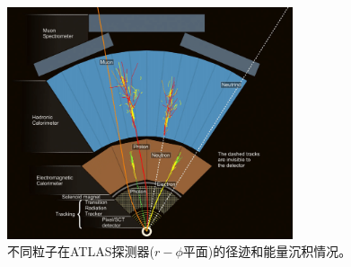 \begin{figure}
\centering
\includegraphics[width=0.75\textwidth]{fig/particle_ID_patterns.png}
\caption{不同粒子在ATLAS探测器($r-\phi$平面)的径迹和能量沉积情况。}
\label{fig:particle_id_patterns}
\end{figure}

